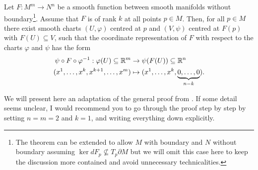 \begin{theorem}\label{thm:rank}
  Let $F : M^m \to N^n$ be a smooth function between smooth manifolds without boundary\footnote{The theorem can be extended to allow $M$ with boundary and $N$ without boundary assuming $\ker dF_p \not\subseteq T_p\partial M$ but we will omit this case here to keep the discussion more contained and avoid unnecessary technicalities.}.
  Assume that $F$ is of rank $k$ at all points $p\in M$.
  Then, for all $p\in M$ there exist smooth charts $(U, \varphi)$ centred at $p$ and $(V, \psi)$ centred at $F(p)$ with $F(U)\subseteq V$, such that the coordinate representation of $F$ with respect to the charts $\varphi$ and $\psi$ has the form
  \begin{align}
    \psi \circ F \circ \varphi^{-1} : \varphi(U) \subseteq \R^m &\to \psi(F(U)) \subseteq \R^n \\
    (x^1, \ldots, x^k, x^{k+1}, \ldots, x^m) &\mapsto (x^1, \ldots, x^k, \LaTeXunderbrace{0, \ldots, 0}_{n-k}).
  \end{align}
\end{theorem}

We will present here an adaptation of the general proof from \cite[Theorem 4.12]{book:lee}.
If some detail seems unclear, I would recommend you to go through the proof step by step by setting $n=m=2$ and $k=1$, and writing everything down explicitly.


